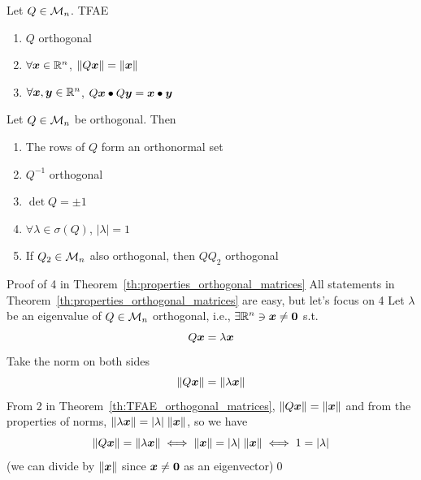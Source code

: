 \documentclass[aspectratio=169]{beamer}\usepackage[]{graphicx}\usepackage[]{xcolor}
\begin{document}
\begin{frame}
\begin{theorem}
\label{th:TFAE_orthogonal_matrices}
Let $Q\in\mathcal{M}_n$. TFAE
\begin{enumerate}
\item $Q$ orthogonal
\item $\forall\bm{x}\in\mathbb{R}^n$, $\|Q\bm{x}\|=\|\bm{x}\|$
\item $\forall\bm{x},\bm{y}\in\mathbb{R}^n$, $Q\bm{x}\bullet Q\bm{y}=\bm{x}\bullet\bm{y}$
\end{enumerate}
\end{theorem}
\vfill
\begin{importanttheorem}\label{th:properties_orthogonal_matrices}
Let $Q\in\mathcal{M}_n$ be orthogonal. Then
\begin{enumerate}
\item The rows of $Q$ form an orthonormal set
\item $Q^{-1}$ orthogonal
\item $\det Q=\pm 1$
\item $\forall\lambda\in\sigma(Q)$, $|\lambda|=1$
\item If $Q_2\in\mathcal{M}_n$ also orthogonal, then $QQ_2$ orthogonal
\end{enumerate}
\end{importanttheorem}
\end{frame}



\begin{frame}{Proof of 4 in Theorem~\ref{th:properties_orthogonal_matrices}}
All statements in Theorem~\ref{th:properties_orthogonal_matrices} are easy, but let's focus on 4 
\vfill
Let $\lambda$ be an eigenvalue of $Q\in\mathcal{M}_n$ orthogonal, i.e., $\exists\IR^n\ni\bx\neq\b0$ s.t.
\[
Q\bm{x} = \lambda\bm{x}
\]
Take the norm on both sides
\[
\|Q\bm{x}\| = \|\lambda\bm{x}\|
\]
From 2 in Theorem~\ref{th:TFAE_orthogonal_matrices}, $\|Q\bm{x}\|=\|\bm{x}\|$ and from the properties of norms, $\|\lambda\bm{x}\|=|\lambda|\;\|\bm{x}\|$, so we have
\[
\|Q\bm{x}\| = \|\lambda\bm{x}\| \iff \|\bm{x}\| = |\lambda|\;\|\bm{x}\| \iff 1=|\lambda|
\]
(we can divide by $\|\bm{x}\|$ since $\bx\neq \b0$ as an eigenvector)\hfill\qed
\end{frame}








\end{document}
